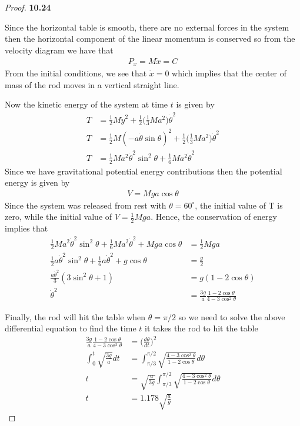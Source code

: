 \documentclass[11pt]{article}
\theoremstyle{definition}
\begin{document}
\begin{proof}{\textbf{10.24}}
\begin{center}
    \end{center}
    Since the horizontal table is smooth, there are no external forces in
    the system then the horizontal component of the linear momentum is
    conserved so from the velocity diagram we have that
    \begin{align*}
        P_x = M\dot{x} = C
    \end{align*}
    From the initial conditions, we see that $\dot{x} = 0$ which implies that
    the center of mass of the rod moves in a vertical straight line.

    Now the kinetic energy of the system at time $t$ is given by
    \begin{align*}
        T &= \frac{1}{2}M\dot{y}^2
        + \frac{1}{2}\bigg(\frac{1}{3}Ma^2\bigg)\dot{\theta}^2\\
        T &= \frac{1}{2}M(-a\dot\theta\sin\theta)^2 
        + \frac{1}{2}\bigg(\frac{1}{3}Ma^2\bigg)\dot{\theta}^2\\
        T &= \frac{1}{2}Ma^2\dot\theta^2\sin^2\theta
        + \frac{1}{6}Ma^2\dot{\theta}^2
    \end{align*}
    Since we have gravitational potential energy contributions then
    the potential energy is given by
    \begin{align*}
        V = Mga\cos\theta 
    \end{align*}
    Since the system was released from rest with $\theta = 60^\circ$, the
    initial value of T is zero, while the initial value of
    $V = \frac{1}{2}Mga$. Hence, the conservation of energy implies that
    \begin{align*}
        \frac{1}{2}Ma^2\dot\theta^2\sin^2\theta + \frac{1}{6}Ma^2\dot{\theta}^2
        + Mga\cos\theta &= \frac{1}{2}Mga\\
        \frac{1}{2}a\dot\theta^2\sin^2\theta + \frac{1}{6}a\dot{\theta}^2
        + g\cos\theta &= \frac{g}{2}\\
        \frac{a\dot\theta^2}{3}(3\sin^2\theta + 1)
        &= g(1 - 2\cos\theta)\\
        \dot\theta^2
        &= \frac{3g}{a}\frac{1 - 2\cos\theta}{4 -3\cos^2\theta}
    \end{align*}
    
    Finally, the rod will hit the table when $\theta = \pi/2$ so we need to
    solve the above differential equation to find the time $t$ it takes the
    rod to hit the table
    \begin{align*}
        \frac{3g}{a}\frac{1 - 2\cos\theta}{4 -3\cos^2\theta}
        &= \bigg(\frac{d\theta}{dt}\bigg)^2\\
        \int_0^t\sqrt{\frac{3g}{a}}dt
        &= \int_{\pi/3}^{\pi/2}\sqrt{\frac{4 -3\cos^2\theta}{1 - 2\cos\theta}}d\theta\\
        t &= \sqrt{\frac{a}{3g}}
        \int_{\pi/3}^{\pi/2}\sqrt{\frac{4 -3\cos^2\theta}{1 - 2\cos\theta}}d\theta\\
        t &= 1.178 \sqrt{\frac{a}{g}}
    \end{align*}
    \end{proof}
\end{document}
